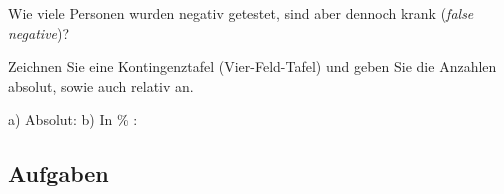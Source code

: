 Wie viele Personen wurden negativ getestet, sind aber dennoch krank (\textit{false negative})?

Zeichnen Sie eine Kontingenztafel (Vier-Feld-Tafel) und geben Sie die
Anzahlen absolut, sowie auch relativ an.


a) Absolut: 
b) In \%  : 

\subsection*{Aufgaben}
\newpage
